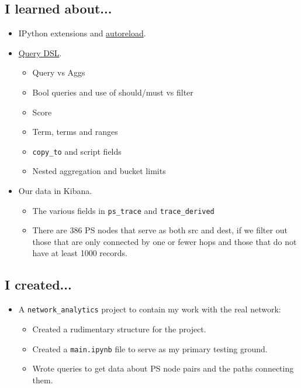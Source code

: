 \documentclass{weeklyreport}
\begin{document}
\subsection*{I learned about...}
\begin{itemize}
	\item IPython extensions and \href{https://switowski.com/blog/ipython-autoreload}{autoreload}.
	\item \href{https://www.elastic.co/guide/en/elasticsearch/reference/current/query-dsl.html}{Query DSL}.
	\begin{itemize}
		\item Query vs Aggs
		\item Bool queries and use of should/must vs filter
		\item Score
		\item Term, terms and ranges
		\item \texttt{copy\_to} and script fields
		\item Nested aggregation and bucket limits
	\end{itemize}
	\item Our data in Kibana.
	\begin{itemize}
		\item The various fields in \texttt{ps\_trace} and \texttt{trace\_derived}
		\item There are 386 PS nodes that serve as both src and dest, if we filter out those that are only connected by one or fewer hops and those that do not have at least 1000 records.
	\end{itemize}
\end{itemize}

\subsection*{I created...}
\begin{itemize}
	\item A \texttt{network\_analytics} project to contain my work with the real network:
	\begin{itemize}
		\item Created a rudimentary structure for the project.
		\item Created a \texttt{main.ipynb} file to serve as my primary testing ground.
		\item Wrote queries to get data about PS node pairs and the paths connecting them.
	\end{itemize}

\end{itemize}
\end{document}
